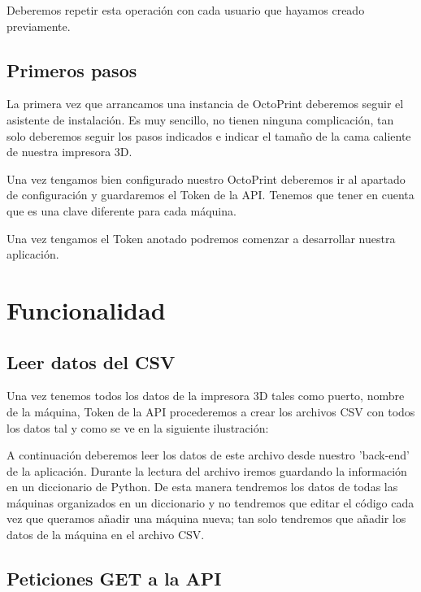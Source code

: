 Deberemos repetir esta operación con cada usuario que hayamos creado previamente.


\subsection{Primeros pasos}

La primera vez que arrancamos una instancia de OctoPrint deberemos seguir el asistente de instalación. Es muy sencillo, no tienen ninguna complicación, tan solo deberemos seguir los pasos indicados e indicar el tamaño de la cama caliente de nuestra impresora 3D.

Una vez tengamos bien configurado nuestro OctoPrint deberemos ir al apartado de configuración y guardaremos el Token de la API. Tenemos que tener en cuenta que es una clave diferente para cada máquina.


Una vez tengamos el Token anotado podremos comenzar a desarrollar nuestra aplicación.

\section{Funcionalidad}

\subsection{Leer datos del CSV}

Una vez tenemos todos los datos de la impresora 3D tales como puerto, nombre de la máquina, Token de la API procederemos a crear los archivos CSV con todos los datos tal y como se ve en la siguiente ilustración:


A continuación deberemos leer los datos de este archivo desde nuestro 'back-end' de la aplicación. Durante la lectura del archivo iremos guardando la información en un diccionario de Python. De esta manera tendremos los datos de todas las máquinas organizados en un diccionario y no tendremos que editar el código cada vez que queramos añadir una máquina nueva; tan solo tendremos que añadir los datos de la máquina en el archivo CSV.

\subsection{Peticiones GET a la API}

